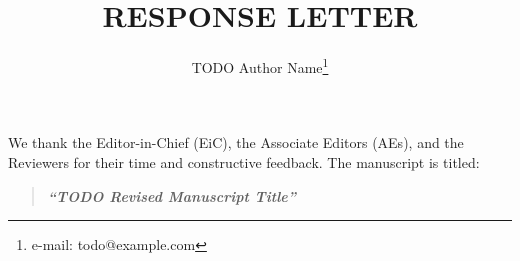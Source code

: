\documentclass[11pt, dvipdfmx]{article}
\title{\textbf{RESPONSE LETTER}}
\author[1]{TODO Author Name\thanks{e-mail: todo@example.com}}
\affil[1]{TODO Author Affiliation}
\date{}
\begin{document}
\maketitle

We thank the Editor-in-Chief (EiC), the Associate Editors (AEs), and the Reviewers for their time and constructive feedback.
The manuscript is titled:
\begin{quote}
\textbf{\textit{``TODO Revised Manuscript Title''}}
\end{quote}

\end{document}
